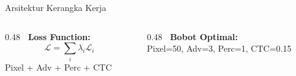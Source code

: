 \documentclass[aspectratio=169,10pt,t]{beamer}
\begin{document}
\begin{frame}{Arsitektur Kerangka Kerja}
    \vspace{0.2em}
    \begin{columns}[T]
        \begin{column}{0.48\textwidth}
            \textbf{\faCog~Loss Function:}
            \begin{equation*}
                \mathcal{L} = \sum_{i} \lambda_i \mathcal{L}_{i}
            \end{equation*}
            {\scriptsize Pixel + Adv + Perc + CTC}\end{column}
        \begin{column}{0.48\textwidth}
            \textbf{\faBalanceScale~Bobot Optimal:}\\
            Pixel=50, Adv=3, Perc=1, CTC=0.15
        \end{column}
    \end{columns}
\end{frame}
\end{document}
